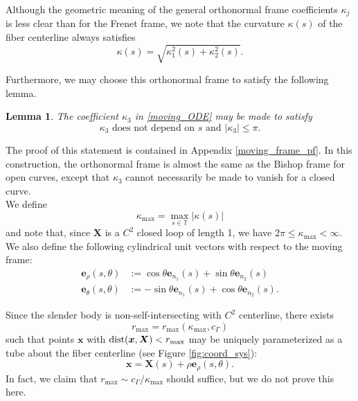 \documentclass[11pt]{article}
\numberwithin{equation}{section}
\newcommand{\T}{\mathbb{T}}
\newcommand{\bx}{\bm{x}}
\newcommand{\X}{\bm{X}}
\newcommand{\be}{\bm{e}}
\newcommand{\abs}[1]{\left\lvert #1 \right\rvert}
\newtheorem{lemma}[theorem]{Lemma}
\theoremstyle{definition}
\begin{document}
Although the geometric meaning of the general orthonormal frame coefficients $\kappa_j$ is less clear than for the Frenet frame, we note that the curvature $\kappa(s)$ of the fiber centerline always satisfies
\begin{equation}\label{kappa12}
\kappa(s)=\sqrt{\kappa_1^2(s)+\kappa_2^2(s)}.
\end{equation}

Furthermore, we may choose this orthonormal frame to satisfy the following lemma.  
 \begin{lemma}\label{lemmaorthonormal}
The coefficient $\kappa_3$ in \eqref{moving_ODE} may be made to satisfy
\begin{equation}\label{kappa3}
\kappa_3 \text{ does not depend on } s \text{ and } |\kappa_3| \le \pi.
\end{equation}
\end{lemma}
The proof of this statement is contained in Appendix \ref{moving_frame_pf}. In this construction, the orthonormal frame is almost the same as the Bishop frame \cite{bishop1975there} for open curves, except that $\kappa_3$ cannot necessarily be made to vanish for a closed curve. \\

We define
\begin{equation}\label{kappamax}
\kappa_{\max}=\max_{s\in\T} \abs{\kappa(s)}
\end{equation}
and note that, since $\X$ is a $C^2$ closed loop of length 1, we have $2\pi\le \kappa_{\max}<\infty$. \\

We also define the following cylindrical unit vectors with respect to the moving frame: 
\begin{align*}
\be_{\rho}(s,\theta) &:= \cos\theta \be_{n_1}(s) + \sin\theta\be_{n_2}(s) \\
\be_{\theta}(s,\theta) &:= -\sin\theta \be_{n_1}(s) + \cos\theta\be_{n_2}(s).
\end{align*}

Since the slender body is non-self-intersecting with $C^2$ centerline, there exists
\begin{equation}\label{rmax}
r_{\max} = r_{\max}(\kappa_{\max},c_\Gamma)
\end{equation}
such that points $\bx$ with ${\rm dist}(\bx,\X)< r_{\max}$ may be uniquely parameterized as a tube about the fiber centerline (see Figure \ref{fig:coord_sys}):
\begin{equation}\label{coordinates}
 \bx = \X(s)+\rho\be_{\rho}(s,\theta). 
 \end{equation}
 In fact, we claim that $r_{\max} \sim c_\Gamma/\kappa_{\max}$ should suffice, but we do not prove this here. \\
\end{document}
